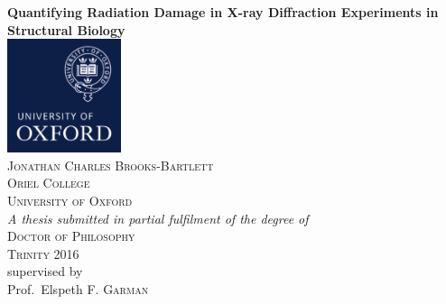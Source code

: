 \begin{titlepage}
	\centering
	{\huge\bfseries Quantifying Radiation Damage in X-ray Diffraction Experiments in Structural Biology\\}
	\vspace{2.0cm}
	\includegraphics[width=0.25\textwidth]{figures/titlepage/ox_brand_cmyk_pos.pdf}\\
	\vspace{2.0cm}
	{\scshape\normalsize Jonathan Charles Brooks-Bartlett\\}
	{\scshape\normalsize Oriel College\\}
	{\scshape\normalsize University of Oxford\\}
	\vspace{1.0cm}
	{\normalsize\itshape A thesis submitted in partial fulfilment of the degree of\\}
	{\scshape\normalsize Doctor of Philosophy\\}
	{\scshape\normalsize Trinity 2016\\}
	\vspace{1.0cm}
	supervised by\\
	Prof.~Elspeth \textsc{F. Garman}
\end{titlepage}
